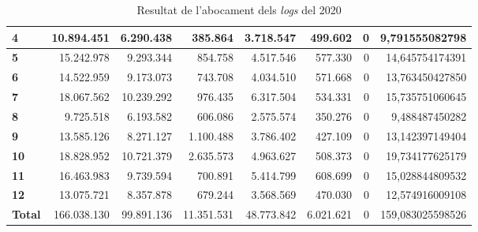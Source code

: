 \begin{table}[h!]
\begin{adjustbox}{width=1.2\textwidth, center}
\begin{tabular}{|l|r|r|r|r|r|r|r|}
            \textbf{4}     & 10.894.451  & 6.290.438  & 385.864    & 3.718.547  & 499.602   & 0 & 9,791555082798   \\
            \midrule
            \textbf{5}     & 15.242.978  & 9.293.344  & 854.758    & 4.517.546  & 577.330   & 0 & 14,645754174391  \\
            \textbf{6}     & 14.522.959  & 9.173.073  & 743.708    & 4.034.510  & 571.668   & 0 & 13,763450427850  \\
            \textbf{7}     & 18.067.562  & 10.239.292 & 976.435    & 6.317.504  & 534.331   & 0 & 15,735751060645  \\
            \textbf{8}     & 9.725.518   & 6.193.582  & 606.086    & 2.575.574  & 350.276   & 0 & 9,488487450282   \\
            \midrule
            \textbf{9}     & 13.585.126  & 8.271.127  & 1.100.488  & 3.786.402  & 427.109   & 0 & 13,142397149404  \\
            \textbf{10}    & 18.828.952  & 10.721.379 & 2.635.573  & 4.963.627  & 508.373   & 0 & 19,734177625179  \\
            \textbf{11}    & 16.463.983  & 9.739.594  & 700.891    & 5.414.799  & 608.699   & 0 & 15,028844809532  \\
            \textbf{12}    & 13.075.721  & 8.357.878  & 679.244    & 3.568.569  & 470.030   & 0 & 12,574916009108  \\
            \midrule
            \textbf{Total} & 166.038.130 & 99.891.136 & 11.351.531 & 48.773.842 & 6.021.621 & 0 & 159,083025598526 \\
            \bottomrule
        \end{tabular}
    \end{adjustbox}
    \caption{Resultat de l'abocament dels \textit{logs} del 2020}
    \label{tab:logs-table-2020}
\end{table}
